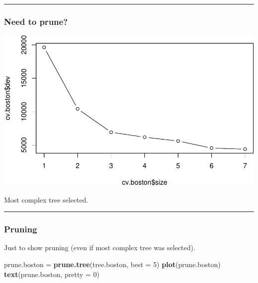 \documentclass[]{article}
\newenvironment{Shaded}{\begin{snugshade}}{\end{snugshade}}
\newcommand{\DataTypeTok}[1]{\textcolor[rgb]{0.13,0.29,0.53}{#1}}
\newcommand{\DecValTok}[1]{\textcolor[rgb]{0.00,0.00,0.81}{#1}}
\newcommand{\KeywordTok}[1]{\textcolor[rgb]{0.13,0.29,0.53}{\textbf{#1}}}
\newcommand{\NormalTok}[1]{#1}
\newcommand{\OperatorTok}[1]{\textcolor[rgb]{0.81,0.36,0.00}{\textbf{#1}}}
\newcommand{\StringTok}[1]{\textcolor[rgb]{0.31,0.60,0.02}{#1}}
\begin{document}
\begin{center}\rule{0.5\linewidth}{\linethickness}\end{center}

\hypertarget{need-to-prune}{%
\subsubsection{Need to prune?}\label{need-to-prune}}

\begin{Shaded}
\end{Shaded}

\includegraphics{8Trees_files/figure-latex/unnamed-chunk-40-1.pdf}

Most complex tree selected.

\begin{center}\rule{0.5\linewidth}{\linethickness}\end{center}

\hypertarget{pruning}{%
\subsubsection{Pruning}\label{pruning}}

Just to show pruning (even if most complex tree was selected).

\begin{Shaded}
\begin{Highlighting}[]
\NormalTok{prune.boston =}\StringTok{ }\KeywordTok{prune.tree}\NormalTok{(tree.boston, }\DataTypeTok{best =} \DecValTok{5}\NormalTok{)}
\KeywordTok{plot}\NormalTok{(prune.boston)}
\KeywordTok{text}\NormalTok{(prune.boston, }\DataTypeTok{pretty =} \DecValTok{0}\NormalTok{)}
\end{Highlighting}
\end{Shaded}
\end{document}
